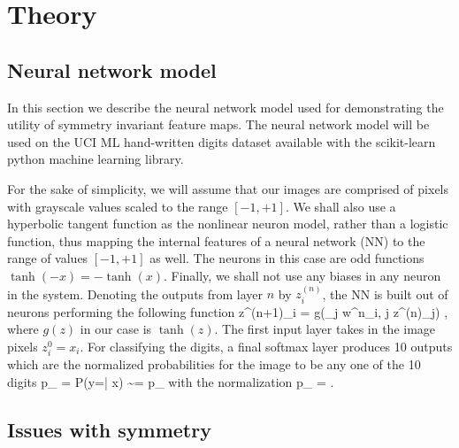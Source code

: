 \documentclass[twocolumn, prl]{revtex4-1}
\begin{document}



\section{Theory}
\label{Sec:theory}
\subsection{Neural network model}
\label{Sec:dumb_NN}

In this section we describe the neural network model used for demonstrating the utility of symmetry invariant feature maps. The neural network model will be used on the UCI ML hand-written digits dataset available with the scikit-learn python machine learning library.

For the sake of simplicity, we will assume that our images are comprised of pixels with grayscale values scaled to the range $[-1,+1]$. We shall also use a hyperbolic tangent function as the nonlinear neuron model, rather than a logistic function, thus mapping the internal features of a neural network (NN) to the range of values $[-1, +1]$ as well. The neurons in this case are odd functions $\tanh(-x) = - \tanh(x)$. Finally, we shall not use any biases in any neuron in the system. Denoting the outputs from layer $n$ by $z^{(n)}_i$, the NN is built out of neurons performing the following function
\be
z^{(n+1)}_i = g\left(\sum_j w^n_{i, j} z^{(n)}_j\right)
\; ,
\ee
where $g(z)$ in our case is $\tanh(z)$.
The first input layer takes in the image pixels $z^0_i = x_i$. For classifying the digits, a final softmax layer produces 10 outputs which are the normalized probabilities for the image to be any one of the 10 digits
\be
p_{\alpha} = P(y=\alpha | x) \sim \exp{} = {\tilde p}_{\alpha}
\ee
with the normalization
\be
p_{\alpha} = 
\; .
\ee

\subsection{Issues with symmetry}
\end{document}
